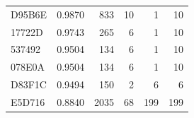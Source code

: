 \begin{table}[ht]
\begin{tabular}{lrrrrr}
 D95B6E & 0.9870 &   833 &    10 &     1 &    10 \\
 17722D & 0.9743 &   265 &     6 &     1 &    10 \\
 537492 & 0.9504 &   134 &     6 &     1 &    10 \\
 078E0A & 0.9504 &   134 &     6 &     1 &    10 \\
 D83F1C & 0.9494 &   150 &     2 &     6 &     6 \\
 E5D716 & 0.8840 &  2035 &    68 &   199 &   199 \\ 
   \hline
 \end{tabular}
 \label{tab:simidroid-outputs}
\end{table}



